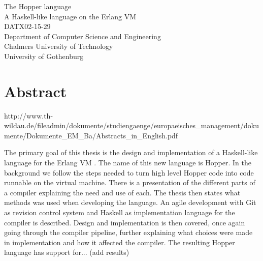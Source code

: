 The Hopper language\\
A Haskell-like language on the Erlang VM\\
DATX02-15-29\\
Department of Computer Science and Engineering\\
Chalmers University of Technology\\
University of Gothenburg\\

\thispagestyle{plain}			%
\section*{Abstract}



http://www.th-wildau.de/fileadmin/dokumente/studiengaenge/europaeisches_management/dokumente/Dokumente_EM_Ba/Abstracts_in_English.pdf







The primary goal of this thesis is the design and implementation of a Haskell-like language for the Erlang VM . The name of this new language is Hopper.
In the background we follow the steps needed to turn high level Hopper code into code runnable on the virtual machine. There is a presentation of the different parts of a compiler explaining the need and use of each. The thesis then states what methods was used when developing the language. An agile development with Git as revision control system and Haskell as implementation language for the compiler is described. Design and implementation is then covered, once again going through the compiler pipeline, further explaining what choices were made in implementation and how it affected the compiler.
The resulting Hopper language has support for... (add results)

